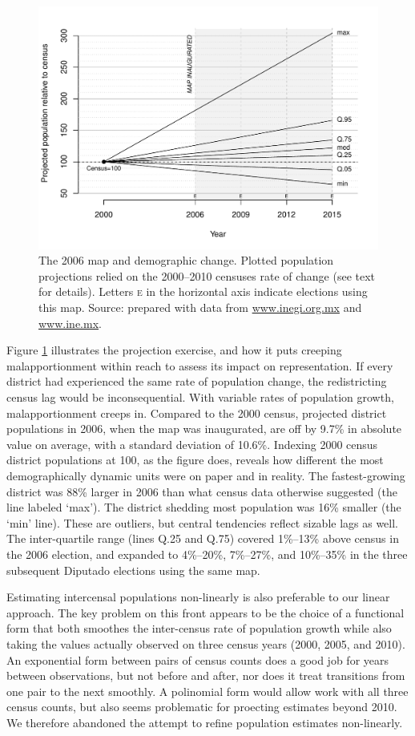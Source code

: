 \documentclass[letter,12pt]{article}
\begin{document}
\begin{figure}
\centering 
  \includegraphics[width=.8\columnwidth]{disRelPopProj2006map.pdf} 
  \caption{The 2006 map and demographic change. Plotted population projections relied on the 2000--2010 censuses rate of change (see text for details). Letters \textsc{e} in the horizontal axis indicate elections using this map. Source: prepared with data from \url{www.inegi.org.mx} and \url{www.ine.mx}.}\label{F:disRelPop2006map}
\end{figure}

Figure \ref{F:disRelPop2006map} illustrates the projection exercise, and how it puts creeping malapportionment within reach to assess its impact on representation. If every district had experienced the same rate of population change, the redistricting census lag would be inconsequential. With variable rates of population growth, malapportionment creeps in. Compared to the 2000 census, projected district populations in 2006, when the map was inaugurated, are off by 9.7\% in absolute value on average, with a standard deviation of 10.6\%. Indexing 2000 census district populations at 100, as the figure does, reveals how different the most demographically dynamic units were on paper and in reality. The fastest-growing district was 88\% larger in 2006 than what census data otherwise suggested (the line labeled `max'). The district shedding most population was 16\% smaller (the `min' line). These are outliers, but central tendencies reflect sizable lags as well. The inter-quartile range (lines Q.25 and Q.75) covered 1\%--13\% above census in the 2006 election, and expanded to 4\%--20\%, 7\%--27\%, and 10\%--35\% in the three subsequent Diputado elections using the same map.

Estimating intercensal populations non-linearly is also preferable to our linear approach. The key problem on this front appears to be the choice of a functional form that both smoothes the inter-census rate of population growth while also taking the values actually observed on three census years (2000, 2005, and 2010). An exponential form between pairs of census counts \citep{dasGupta1978RateGrowth} does a good job for years between observations, but not before and after, nor does it treat transitions from one pair to the next smoothly. A polinomial form would allow work with all three census counts, but also seems problematic for proecting estimates beyond 2010. We therefore abandoned the attempt to refine population estimates non-linearly.
\end{document}
